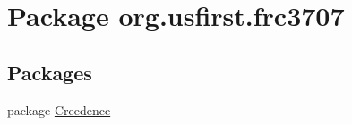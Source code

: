 \hypertarget{namespaceorg_1_1usfirst_1_1frc3707}{}\section{Package org.\+usfirst.\+frc3707}
\label{namespaceorg_1_1usfirst_1_1frc3707}
\subsection*{Packages}
\begin{DoxyCompactItemize}
\item 
package \mbox{\hyperlink{namespaceorg_1_1usfirst_1_1frc3707_1_1_creedence}{Creedence}}
\end{DoxyCompactItemize}
